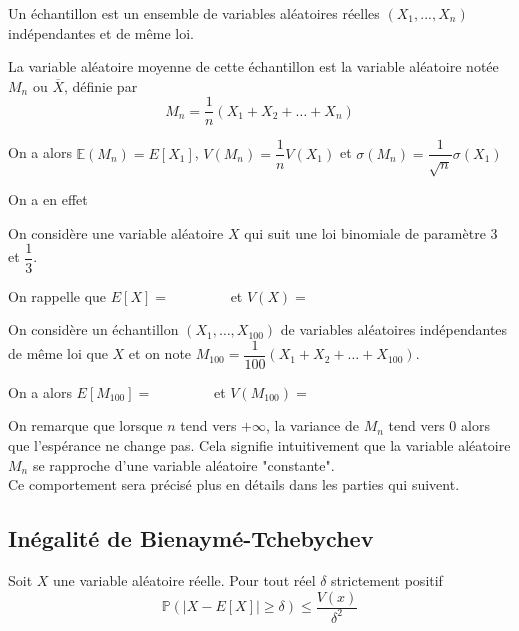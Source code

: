 \documentclass[11pt,fleqn, openany]{book} %
\begin{document}
\begin{definition} Un échantillon est un ensemble de variables aléatoires réelles $(X_1, ..., X_n)$ indépendantes et de même loi.

La variable aléatoire moyenne de cette échantillon est la variable aléatoire notée $M_n$ ou $\overline{X}$, définie par 
\[ M_n = \dfrac{1}{n} (X_1+X_2+\ldots + X_n)\]\end{definition}


\begin{proposition}On a alors $\mathbb{E}(M_n)=E[X_1]$, $V(M_n)=\dfrac{1}{n}V(X_1)$ et $\sigma(M_n)=\dfrac{1}{\sqrt{n}}\sigma(X_1)$\end{proposition}

\begin{demonstration}On a en effet
\vskip130pt
\end{demonstration}


\begin{example} On considère une variable aléatoire $X$ qui suit une loi binomiale de paramètre $3$ et $\dfrac{1}{3}$. 

On rappelle que $E[X]=\qquad \qquad$ et $V(X)=$

On considère un échantillon $(X_1, \ldots, X_{100})$ de variables aléatoires indépendantes de même loi que $X$ et on note $M_{100} = \dfrac{1}{100} (X_1+X_2+\ldots + X_{100})$.

On a alors $E[M_{100}]=\qquad\qquad$ et $V(M_{100})=$\end{example}

On remarque que lorsque $n$ tend vers $+\infty$, la variance de $M_n$ tend vers 0 alors que l'espérance ne change pas. Cela signifie intuitivement que la variable aléatoire $M_n$ se rapproche d'une variable aléatoire "constante".\\ Ce comportement sera précisé plus en détails dans les parties qui suivent.

\newpage
\subsection{Inégalité de Bienaymé-Tchebychev}

\begin{proposition} Soit $X$ une variable aléatoire réelle. Pour tout réel $\delta$ strictement positif
\[ \mathbb{P}(|X-E[X]| \geqslant \delta) \leqslant \dfrac{V(x)}{\delta ^2}\]
\vspace{-0,5cm}\end{proposition}
\end{document}

